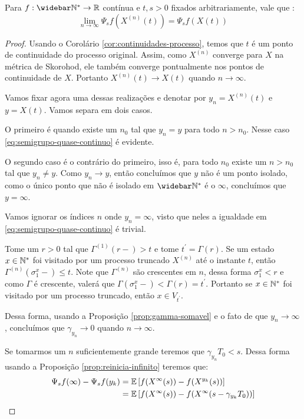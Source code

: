 \begin{proposicao}
  \label{prop:semigrupo-quase-continuo}
  Para $f: \Nzb \to \R$ contínua e $t, s > 0$ fixados arbitrariamente,
  vale que \qc:
  \begin{equation}
    \label{eq:semigrupo-quase-continuo}
    \lim_{n \to \infty} \Psi_s f (X^{(n)}(t)) = \Psi_s f(X(t))
  \end{equation}
\end{proposicao}
\begin{proof}
  Usando o Corolário \ref{cor:continuidades-processo}, temos que $t$ é
  \qc um ponto de continuidade do processo original. Assim, como
  $X^{(n)}$ converge \qc para $X$ na métrica de Skorohod, ele também
  converge pontualmente nos pontos de continuidade de $X$. Portanto
  $X^{(n)}(t) \to X(t)$ \qc quando $n \to \infty$.

  Vamos fixar agora uma dessas realizações e denotar por $y_n =
  X^{(n)}(t)$ e $y = X(t)$. Vamos separa em dois casos.

  O primeiro é quando existe um $n_0$ tal que $y_n = y$ para todo $n >
  n_0$. Nesse caso \eqref{eq:semigrupo-quase-continuo} é evidente.

  O segundo caso é o contrário do primeiro, isso é, para todo $n_0$
  existe um $n > n_0$ tal que $y_n \neq y$. Como $y_n \to y$, então
  concluímos que $y$ não é um ponto isolado, como o único ponto que
  não é isolado em $\Nzb$ é o $\infty$, concluímos que $y = \infty$.

  Vamos ignorar os índices $n$ onde $y_n = \infty$, visto que neles a
  igualdade em \eqref{eq:semigrupo-quase-continuo} é trivial. 

  Tome um $r > 0$ tal que $\Gamma^{(1)}(r-) > t$ e tome $t^\prime =
  \Gamma(r)$. Se um estado $x\in {\mathbb{N^*}}$ foi visitado por um processo
  truncado $X^{(n)}$ até o instante $t$, então
  $\Gamma^{(n)}(\sigma_1^x-) \leq t$. Note que $\Gamma^{(n)}$ são
  crescentes em $n$, dessa forma $\sigma_1^x < r$ e como $\Gamma$ é
  crescente, valerá que $\Gamma(\sigma_1^x-) < \Gamma(r) =
  t^\prime$. Portanto se $x \in {\mathbb{N^*}}$ foi visitado por um processo
  truncado, então $x \in V_{t^\prime}$.

  Dessa forma, usando a Proposição \ref{prop:gamma-somavel} e o fato
  de que $y_n \to \infty$, concluímos que $\gamma_{y_n} \to 0$ quando
  $n \to \infty$.

  Se tomarmos um $n$ suficientemente grande teremos que $\gamma_{y_n}
  T_0 < s$. Dessa forma usando a Proposição
  \ref{prop:reinicia-infinito} teremos que:
  \begin{align*}
    \Psi_s f (\infty) - \Psi_s f (y_k) &=
    {\mathbb{E}}\left[ f(X^\infty(s)) - f(X^{y_k}(s)) \right] \\
    &= {\mathbb{E}}\left[ f(X^\infty(s)) -f (X^\infty(s - \gamma_{y_k}T_0)) \right] \\
  \end{align*}


\end{proof}
